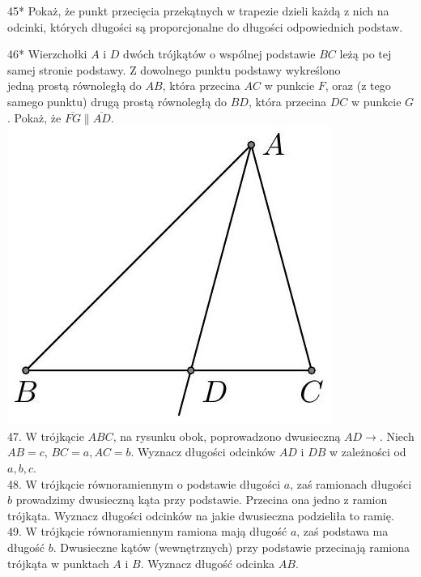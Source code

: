 \documentclass[10pt]{article}
\begin{document}
45* Pokaż, że punkt przecięcia przekątnych w trapezie dzieli każdą z nich na odcinki, których długości są proporcjonalne do długości odpowiednich podstaw.

46* Wierzchołki \(A\) i \(D\) dwóch trójkątów o wspólnej podstawie \(B C\) leżą po tej samej stronie podstawy. Z dowolnego punktu podstawy wykreślono\\
jedną prostą równoległą do \(A B\), która przecina \(A C\) w punkcie \(F\), oraz (z tego samego punktu) drugą prostą równoległą do \(B D\), która przecina \(D C\) w punkcie \(G\). Pokaż, że \(\overline{F G} \| \overline{A D}\).\\
\includegraphics[max width=\textwidth, center]{2024_11_21_e9b4faa005d5be2cc318g-018(1)}\\
47. W trójkącie \(A B C\), na rysunku obok, poprowadzono dwusieczną \(A D \rightarrow\). Niech \(A B=c\), \(B C=a, A C=b\). Wyznacz długości odcinków \(A D\) i \(D B\) w zależności od \(a, b, c\).\\
48. W trójkącie równoramiennym o podstawie długości \(a\), zaś ramionach długości \(b\) prowadzimy dwusieczną kąta przy podstawie. Przecina ona jedno z ramion trójkąta. Wyznacz długości odcinków na jakie dwusieczna podzieliła to ramię.\\
49. W trójkącie równoramiennym ramiona mają długość \(a\), zaś podstawa ma długość \(b\). Dwusieczne kątów (wewnętrznych) przy podstawie przecinają ramiona trójkąta w punktach \(A\) i \(B\). Wyznacz długość odcinka \(A B\).\\
\end{document}
